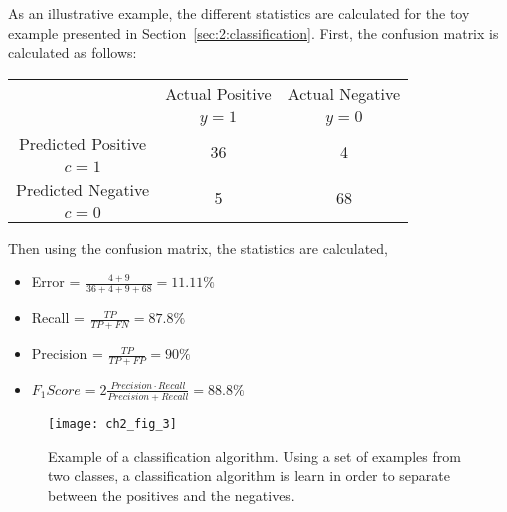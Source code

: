   As an illustrative example, the different statistics are calculated for the toy example presented 
  in Section~\ref{sec:2:classification}. First, the confusion matrix is calculated as 
  follows:
  \begin{center}
    \footnotesize
  \begin{tabular}{c|c|c}
    \multicolumn{1}{c|}{}  & Actual Positive& Actual Negative \\
    \multicolumn{1}{c|}{} & $y=1$& $y=0$ \\
    \hline
    Predicted Positive    & \multirow{ 2}{*}{36} & \multirow{ 
    2}{*}{4} \\
    $c=1$ & &\\
    \hline
    Predicted Negative    & \multirow{ 2}{*}{5} & \multirow{ 
    2}{*}{68} \\
    $c=0$ & &\\
  \end{tabular}
  \end{center}
  Then using the confusion matrix, the statistics are calculated,
 	\begin{itemize}
  	\item Error = $\frac{4+9}{36+4+9+68}=11.11\%$
		\item Recall = $\frac{TP}{TP+FN}=87.8\%$
		\item Precision = $\frac{TP}{TP+FP}=90\%$
		\item $F_1Score = 2\frac{Precision \cdot Recall}{Precision + Recall}=88.8\%$
	\end{itemize}
	
\begin{figure}[t!]
	\centering
	\texttt{[image: ch2\_fig\_3]}
	\caption{Example of a classification algorithm. Using a set of examples from two classes, a 
	classification algorithm is learn in order to separate between the positives and the negatives. }
	\label{fig:ch2:3}
\end{figure}

